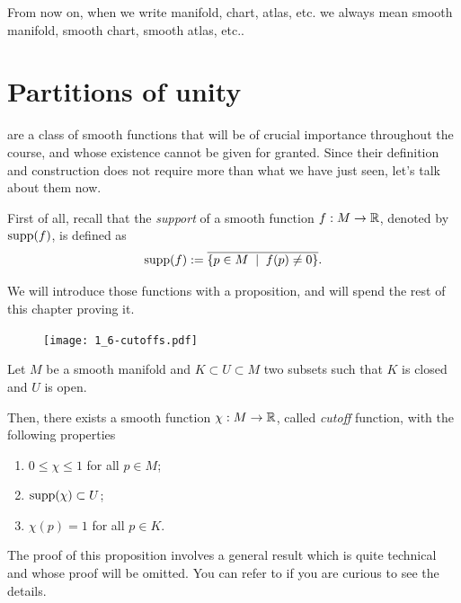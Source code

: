 \begin{tcolorbox}
From now on, when we write manifold, chart, atlas, etc. we always mean smooth manifold, smooth chart, smooth atlas, etc..
\end{tcolorbox}

\section{Partitions of unity}

 are a class of smooth functions that will be of crucial importance throughout the course, and whose existence cannot be given for granted.
Since their definition and construction does not require more than what we have just seen, let's talk about them now.

First of all, recall that the \emph{support} of a smooth function $f: M \to \mathbb{R}$, denoted by $\operatorname{supp}(f)$, is defined as
\begin{equation}
  \operatorname{supp}(f) := \overline{\{ p\in M \;\mid\; f(p) \neq 0\}}.
\end{equation}

We will introduce those functions with a proposition, and will spend the rest of this chapter proving it.

\begin{figure}[htp!]
  \texttt{[image: 1\_6-cutoffs.pdf]}
\end{figure}

\begin{prop}\label{prop:cutoff}
  Let $M$ be a smooth manifold and $K\subset U\subset M$ two subsets such that $K$ is closed and $U$ is open.
  
  Then, there exists a smooth function $\chi: M \to\mathbb{R}$, called \emph{cutoff} function, with the following properties
  \begin{enumerate}
    \item $0 \leq \chi \leq 1$ for all $p\in M$;
    \item $\operatorname{supp}(\chi)\subset U$;
    \item $\chi(p) = 1$ for all $p\in K$.
  \end{enumerate}
\end{prop}

The proof of this proposition involves a general result which is quite technical and whose proof will be omitted.
You can refer to \cite{book:lee, book:tu} if you are curious to see the details.


